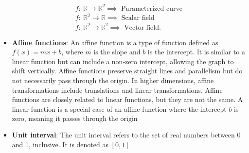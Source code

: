 \documentclass{report}
\begin{document}
\begin{itemize}
\begin{align*}
                f:\ \mathbb{R} \to \mathbb{R}^{2} \implies \text{ Parameterized curve}  \\
                f:\ \mathbb{R^{2}} \to \mathbb{R} \implies \text{ Scalar field}  \\
                f:\ \mathbb{R^{2}} \to \mathbb{R}^{2} \implies \text{ Vector field} 
            .\end{align*}
        \item \textbf{Affine functions}:
            An affine function is a type of function defined as $f(x)=mx+b$, where $m$ is the slope and $b$ is the intercept. It is similar to a linear function but can include a non-zero intercept, allowing the graph to shift vertically. Affine functions preserve straight lines and parallelism but do not necessarily pass through the origin. In higher dimensions, affine transformations include translations and linear transformations.
            \bigbreak \noindent 
            Affine functions are closely related to linear functions, but they are not the same. A linear function is a special case of an affine function where the intercept $b$ is zero, meaning it passes through the origin
        \item \textbf{Unit interval}: The unit interval refers to the set of real numbers between 0 and 1, inclusive. It is denoted as $[0,1]$

    \end{itemize}

    \pagebreak 
\end{document}
